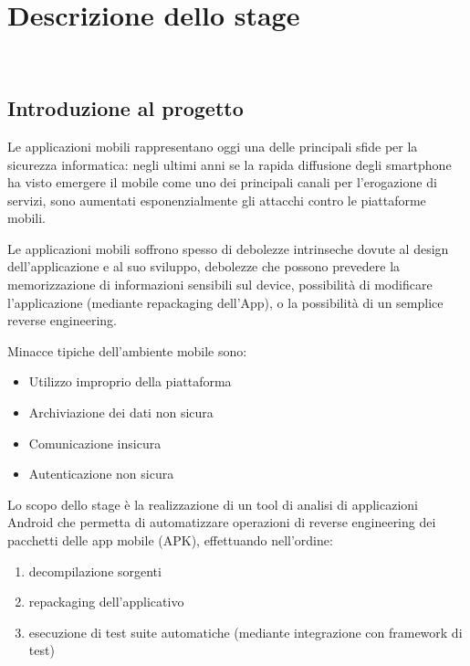 
\chapter{Descrizione dello stage}
\label{cap:descrizione-stage}

\\

\section{Introduzione al progetto}
Le applicazioni mobili rappresentano oggi una delle principali sfide per la sicurezza informatica: negli ultimi anni se la rapida diffusione degli smartphone ha visto emergere il mobile come uno dei principali canali per l'erogazione di servizi, sono aumentati esponenzialmente gli attacchi contro le piattaforme mobili.

Le applicazioni mobili soffrono spesso di debolezze intrinseche dovute al design dell'applicazione e al suo sviluppo, debolezze che possono prevedere la memorizzazione di informazioni sensibili sul device, possibilità di modificare l'applicazione (mediante repackaging dell'App), o la possibilità di un semplice reverse engineering.

Minacce tipiche dell'ambiente mobile sono:
\begin{itemize}
    \setlength\itemsep{0.1em}
    \item Utilizzo improprio della piattaforma
    \item Archiviazione dei dati non sicura
    \item Comunicazione insicura
    \item Autenticazione non sicura
\end{itemize}

Lo scopo dello stage è la realizzazione di un tool di analisi di applicazioni Android che permetta di automatizzare operazioni di reverse engineering dei pacchetti delle app mobile (APK), effettuando nell'ordine:
\begin{enumerate}
    \setlength\itemsep{0.1em}
    \item decompilazione sorgenti
    \item repackaging dell'applicativo
    \item esecuzione di test suite automatiche (mediante integrazione con framework di test)
\end{enumerate}

